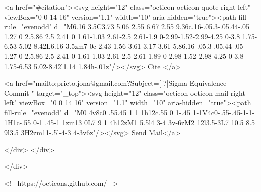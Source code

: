       <a  href="#citation"><svg height="12" class="octicon octicon-quote right left" viewBox="0 0 14 16" version="1.1" width="10" aria-hidden="true"><path fill-rule="evenodd" d="M6.16 3.5C3.73 5.06 2.55 6.67 2.55 9.36c.16-.05.3-.05.44-.05 1.27 0 2.5.86 2.5 2.41 0 1.61-1.03 2.61-2.5 2.61-1.9 0-2.99-1.52-2.99-4.25 0-3.8 1.75-6.53 5.02-8.42L6.16 3.5zm7 0c-2.43 1.56-3.61 3.17-3.61 5.86.16-.05.3-.05.44-.05 1.27 0 2.5.86 2.5 2.41 0 1.61-1.03 2.61-2.5 2.61-1.89 0-2.98-1.52-2.98-4.25 0-3.8 1.75-6.53 5.02-8.42l1.14 1.84h-.01z"/></svg> Cite
      </a>

      <a href="mailto:prieto.jona@gmail.com?Subject=[ ?]Sigma Equivalence - Commit " target="_top"><svg height="12" class="octicon octicon-mail right left" viewBox="0 0 14 16" version="1.1" width="10" aria-hidden="true"><path fill-rule="evenodd" d="M0 4v8c0 .55.45 1 1 1h12c.55 0 1-.45 1-1V4c0-.55-.45-1-1-1H1c-.55 0-1 .45-1 1zm13 0L7 9 1 4h12zM1 5.5l4 3-4 3v-6zM2 12l3.5-3L7 10.5 8.5 9l3.5 3H2zm11-.5l-4-3 4-3v6z"/></svg> Send Mail</a>

    </div>
  </div>

</div>

<!-- https://octicons.github.com/ -->





